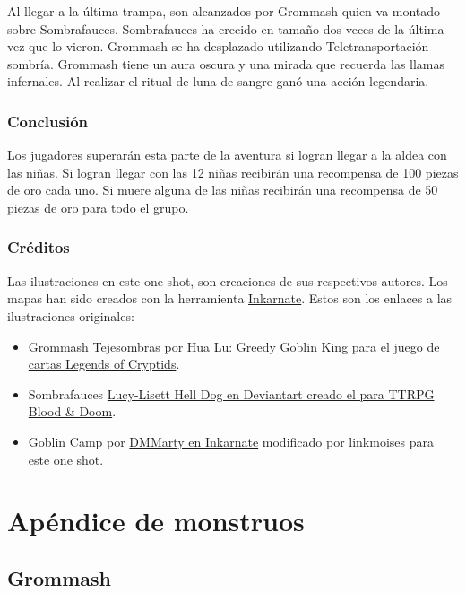 \documentclass[10pt,twoside,twocolumn,openany]{dndbook}
\begin{document}
Al llegar a la última trampa, son alcanzados por Grommash quien va montado sobre Sombrafauces.
Sombrafauces ha crecido en tamaño dos veces de la última vez que lo vieron. Grommash se ha desplazado
utilizando Teletransportación sombría. Grommash tiene un aura oscura y una mirada que recuerda las llamas 
infernales. Al realizar el ritual de luna de sangre ganó una acción legendaria.

\section{Conclusión}

Los jugadores superarán esta parte de la aventura si logran llegar a la aldea con las niñas. Si logran 
llegar con las 12 niñas recibirán una recompensa de 100 piezas de oro cada uno. Si muere alguna de las 
niñas recibirán una recompensa de 50 piezas de oro para todo el grupo.

\section{Créditos}

Las ilustraciones en este one shot, son creaciones de sus respectivos autores. Los mapas han sido 
creados con la herramienta \href{https://inkarnate.com/}{Inkarnate}. Estos son los enlaces a las 
ilustraciones originales:

\begin{itemize}
  \item Grommash Tejesombras por \href{https://legendofthecryptids.fandom.com/wiki/Greedy_Goblin_King}{Hua Lu: Greedy Goblin King para el juego de cartas Legends of Cryptids}.
  \item Sombrafauces \href{https://www.deviantart.com/lucy-lisett/art/Death-Dog-901248620}{Lucy-Lisett Hell Dog en Deviantart creado el para TTRPG Blood \& Doom}.
  \item Goblin Camp por \href{https://inkarnate.com/m/zkNwn5--goblin-camp/}{DMMarty en Inkarnate} modificado por linkmoises para este one shot.
\end{itemize}

\part*{Apéndice de monstruos}

\chapter*{Grommash}
\end{document}
